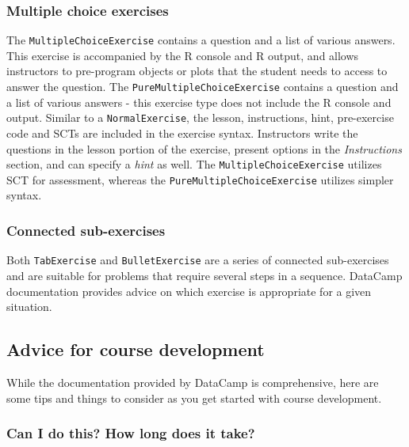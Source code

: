 \documentclass{tise_style_doi}
\begin{document}
\subsubsection{Multiple choice exercises}

The \texttt{MultipleChoiceExercise} contains a question and a list of various answers. 
This exercise is accompanied by the R console and R output, and allows instructors to 
pre-program objects or plots that the student needs to access to answer the question.
The \texttt{PureMultipleChoiceExercise} contains a question and a list of various
answers - this exercise type does not include the R console and output. Similar to a
\texttt{NormalExercise}, the lesson, instructions, hint, pre-exercise code and SCTs are 
included in the exercise syntax. Instructors write the questions in the lesson portion 
of the exercise, present options in the \textit{Instructions} section, and can specify a 
\textit{hint} as well. The \texttt{MultipleChoiceExercise} utilizes SCT for assessment,
whereas the \texttt{PureMultipleChoiceExercise} utilizes simpler syntax.

\subsubsection{Connected sub-exercises}

Both \texttt{TabExercise} and \texttt{BulletExercise} are a series of connected
sub-exercises and are suitable for problems that require several steps in a sequence.
DataCamp documentation provides advice on which exercise is appropriate for a
given situation.

\subsection{Advice for course development}

While the documentation provided by DataCamp is comprehensive, here are some tips 
and things to consider as you get started with course development.

\subsubsection{Can I do this? How long does it take?}
\end{document}
